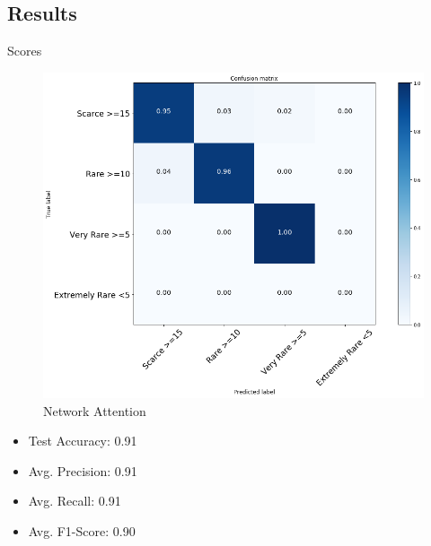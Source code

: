 \documentclass[10pt]{beamer}
\begin{document}
\subsection{Results}

\begin{frame}{Scores}
	\centering
	\begin{minipage}[c]{0.58\linewidth}
		\begin{figure}
			\includegraphics[width=\columnwidth]{images/conf_mat_leo_v2.png}
			\caption{Network Attention}
		\end{figure}
	\end{minipage}
	\begin{minipage}[c]{0.38\linewidth}
		\begin{itemize}
			\item Test Accuracy: 0.91
			\item Avg. Precision: 0.91          
			\item Avg. Recall: 0.91
			\item Avg. F1-Score: 0.90
		\end{itemize}
	\end{minipage}
\end{frame}
\end{document}
